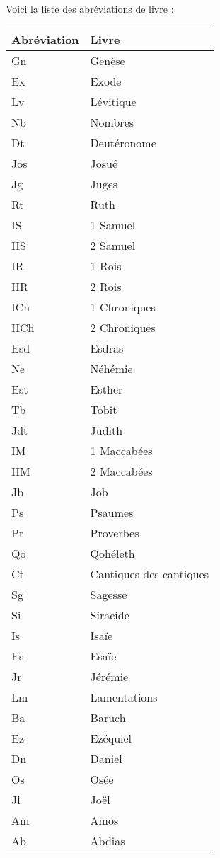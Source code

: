 Voici la liste des abréviations de livre :

\begin{longtable}{|l|l|}
\hline
Abréviation & Livre \\
\hline
\endhead
\hline
\endfoot
Gn    &    Genèse\\
Ex    &    Exode\\
Lv    &    Lévitique\\
Nb    &    Nombres\\
Dt    &    Deutéronome\\
Jos    &    Josué\\
Jg    &    Juges\\
Rt    &    Ruth\\
IS    &    1 Samuel\\
IIS    &    2 Samuel\\
IR    &    1 Rois\\
IIR    &    2 Rois\\
ICh    &    1 Chroniques\\
IICh    &    2 Chroniques\\
Esd    &    Esdras\\
Ne    &    Néhémie\\
Est    &    Esther\\
Tb    &    Tobit\\
Jdt    &    Judith\\
IM    &    1 Maccabées\\
IIM    &    2 Maccabées\\
Jb    &    Job\\
Ps    &    Psaumes\\
Pr    &    Proverbes\\
Qo    &    Qohéleth\\
Ct    &    Cantiques des cantiques\\
Sg    &    Sagesse\\
Si    &    Siracide\\
Is    &    Isaïe\\
Es    &    Esaïe\\
Jr    &    Jérémie\\
Lm    &    Lamentations\\
Ba    &    Baruch\\
Ez    &    Ezéquiel\\
Dn    &    Daniel\\
Os    &    Osée\\
Jl    &    Joël\\
Am    &    Amos\\
Ab    &    Abdias\\

\end{longtable}
